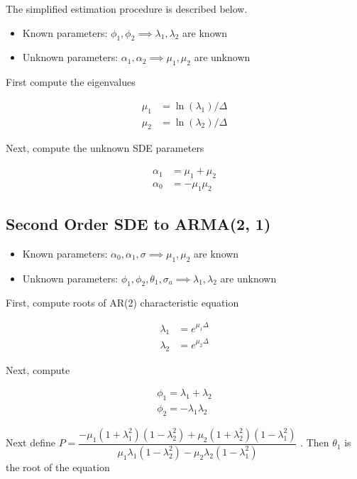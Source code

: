 \documentclass[12pt]{article}
\begin{document}
The simplified estimation procedure is described below.

\begin{itemize}
\item Known parameters: $\phi_{1}, \phi_{2} \implies \lambda_{1}, \lambda_{2}$ are known
\item Unknown parameters: $\alpha_{1}, \alpha_{2} \implies \mu_{1}, \mu_{2}$ are unknown
\end{itemize}

First compute the eigenvalues

\begin{align}
\mu_{1} &= \ln(\lambda_{1}) / \Delta \\
\mu_{2} &= \ln(\lambda_{2}) / \Delta
\end{align}

Next, compute the unknown SDE parameters

\begin{align}
\alpha_{1} &= \mu_{1} + \mu_{2} \\
\alpha_{0} &= -\mu_{1} \mu_{2}
\end{align}

\subsection{Second Order SDE to ARMA(2, 1)}

\begin{itemize}
\item Known parameters: $\alpha_{0}, \alpha_{1}, \sigma \implies \mu_{1}, \mu_{2}$ are known
\item Unknown parameters: $\phi_{1}, \phi_{2}, \theta_{1}, \sigma_{a} \implies \lambda_{1}, \lambda_{2}$ are unknown
\end{itemize}

First, compute roots of AR(2) characteristic equation

\begin{align}
\lambda_{1} &= e^{\mu_{1} \Delta} \\
\lambda_{2} &= e^{\mu_{2} \Delta} 
\end{align}

Next, compute

\begin{align}
\phi_{1} = \lambda_{1} + \lambda_{2} \\
\phi_{2} = -\lambda_{1} \lambda_{2}
\end{align}

Next define $P = \dfrac{-\mu_{1}(1 + \lambda_{1}^2)(1 - \lambda_{2}^2) + \mu_{2} (1 + \lambda_{2}^{2}) (1 - \lambda_{1}^{2})}{\mu_{1} \lambda_{1} (1 - \lambda_{2}^{2}) - \mu_{2}\lambda_{2} (1 - \lambda_{1}^2)}$ . Then $\theta_{1}$ is the root of the equation
\end{document}
